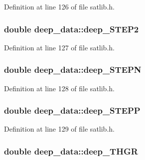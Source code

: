 Definition at line 126 of file satlib.\-h.

\hypertarget{structdeep__data_aff58d59a2247bd4af80e400f20a63280}{
\subsubsection[{deep\-\_\-\-S\-T\-E\-P2}]{\setlength{\rightskip}{0pt plus 5cm}double deep\-\_\-data\-::deep\-\_\-\-S\-T\-E\-P2}}\label{structdeep__data_aff58d59a2247bd4af80e400f20a63280}


Definition at line 127 of file satlib.\-h.

\hypertarget{structdeep__data_ac218806a36921a793c6612d9ae5b8f01}{
\subsubsection[{deep\-\_\-\-S\-T\-E\-P\-N}]{\setlength{\rightskip}{0pt plus 5cm}double deep\-\_\-data\-::deep\-\_\-\-S\-T\-E\-P\-N}}\label{structdeep__data_ac218806a36921a793c6612d9ae5b8f01}


Definition at line 128 of file satlib.\-h.

\hypertarget{structdeep__data_a2792396e57de1566cc7d90b63fc20e92}{
\subsubsection[{deep\-\_\-\-S\-T\-E\-P\-P}]{\setlength{\rightskip}{0pt plus 5cm}double deep\-\_\-data\-::deep\-\_\-\-S\-T\-E\-P\-P}}\label{structdeep__data_a2792396e57de1566cc7d90b63fc20e92}


Definition at line 129 of file satlib.\-h.

\hypertarget{structdeep__data_a590b06dca7a36cf5722d3cde0f56f352}{
\subsubsection[{deep\-\_\-\-T\-H\-G\-R}]{\setlength{\rightskip}{0pt plus 5cm}double deep\-\_\-data\-::deep\-\_\-\-T\-H\-G\-R}}\label{structdeep__data_a590b06dca7a36cf5722d3cde0f56f352}



